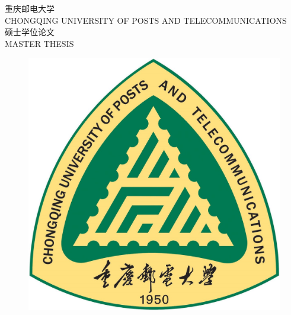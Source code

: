 
\begin{center}

\begin{spacing}{1.0}
	\vspace{10mm}
\erhao 重\hspace{12pt}庆\hspace{12pt}邮\hspace{12pt}电\hspace{12pt}大\hspace{12pt}学\\
\xiaosi CHONGQING UNIVERSITY OF POSTS AND TELECOMMUNICATIONS
\\ [20mm]
\chuhao 硕士学位论文\\
\sanhao MASTER THESIS
\end{spacing}

\vspace{20mm}

        
        \begin{figure}[h]
        	\centering
        	\includegraphics[scale=0.5]{chapters/logo2.jpg}
        \end{figure}
\end{center}

\vspace{5mm}

